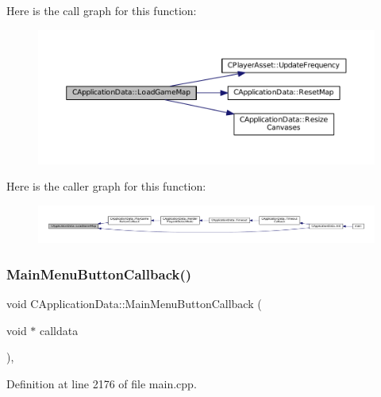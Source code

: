 Here is the call graph for this function\+:\nopagebreak
\begin{figure}[H]
\begin{center}
\leavevmode
\includegraphics[width=350pt]{classCApplicationData_a89af0c7917be766575720e5ac79c8d2d_cgraph}
\end{center}
\end{figure}
Here is the caller graph for this function\+:\nopagebreak
\begin{figure}[H]
\begin{center}
\leavevmode
\includegraphics[width=350pt]{classCApplicationData_a89af0c7917be766575720e5ac79c8d2d_icgraph}
\end{center}
\end{figure}
\hypertarget{classCApplicationData_a4410839118b5b74dab798ad7be6f703b}{}\label{classCApplicationData_a4410839118b5b74dab798ad7be6f703b} 
\subsubsection{\texorpdfstring{Main\+Menu\+Button\+Callback()}{MainMenuButtonCallback()}}
{\footnotesize\ttfamily void C\+Application\+Data\+::\+Main\+Menu\+Button\+Callback (\begin{DoxyParamCaption}\item[{void $\ast$}]{calldata }\end{DoxyParamCaption})\hspace{0.3cm}{\ttfamily [static]}, {\ttfamily [protected]}}



Definition at line 2176 of file main.\+cpp.


